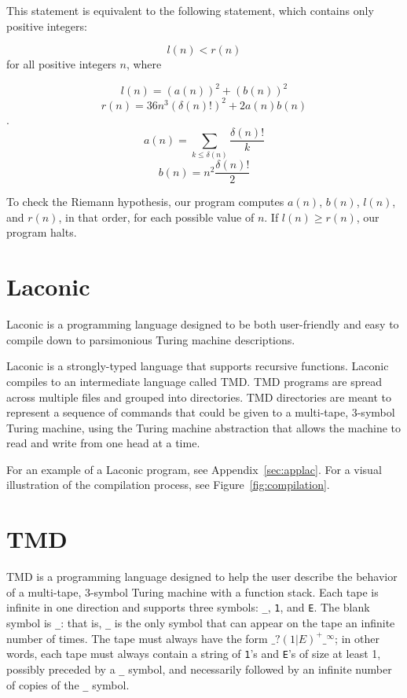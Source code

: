 \documentclass[11pt]{article}
\begin{document}
This statement is equivalent to the following statement, which contains only positive integers\footnotemark:

$$l(n) < r(n)$$ for all positive integers $n$, where

$$l(n) = (a(n))^2 + (b(n))^2$$
$$r(n) = 36n^3(\delta(n)!)^2 + 2a(n)b(n)$$.
$$a(n) = \sum_{k \le \delta(n)} \frac{\delta(n)!}{k}$$
$$b(n) = n^2\frac{\delta(n)!}{2}$$

To check the Riemann hypothesis, our program computes $a(n)$, $b(n)$, $l(n)$, and $r(n)$, in that order, for each possible value of $n$. If $l(n) \ge r(n)$, our program halts.

\section{Laconic}

Laconic is a programming language designed to be both user-friendly and easy to compile down to parsimonious Turing machine descriptions. 

Laconic is a strongly-typed language that supports recursive functions. Laconic compiles to an intermediate language called TMD. TMD programs are spread across multiple files and grouped into directories. TMD directories are meant to represent a sequence of commands that could be given to a multi-tape, 3-symbol Turing machine, using the Turing machine abstraction that allows the machine to read and write from one head at a time. 

For an example of a Laconic program, see Appendix~\ref{sec:applac}. For a visual illustration of the compilation process, see Figure~\ref{fig:compilation}.

\section{TMD}

TMD is a programming language designed to help the user describe the behavior of a multi-tape, 3-symbol Turing machine with a function stack. Each tape is infinite in one direction and supports three symbols: \texttt{\_}, \texttt{1}, and \texttt{E}. The blank symbol is \texttt{\_}: that is, \texttt{\_} is the only symbol that can appear on the tape an infinite number of times. The tape must always have the form $\texttt{\_}?(1|E)^+\texttt{\_}^{\infty}$; in other words, each tape must always contain a string of \texttt{1}'s and \texttt{E}'s of size at least 1, possibly preceded by a \texttt{\_} symbol, and necessarily followed by an infinite number of copies of the \texttt{\_} symbol. 
\end{document}
